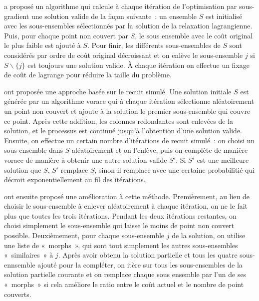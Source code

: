 \documentclass[12pt,letterpaper,twoside]{article}
\begin{document}
				\citeauthor{Beasley1990} a proposé un algorithme qui calcule à chaque itération de l'optimisation par sous-gradient une
				solution valide de la façon suivante : un ensemble \(S\) est initialisé avec les sous-ensembles sélectionnés
				par la solution de la relaxation lagrangienne. Puis, pour chaque point non couvert par \(S\),
				le sous ensemble avec le coût original le plus faible est ajouté à \(S\). Pour finir, les différents sous-ensembles
				de \(S\) sont considérés par ordre de coût original décroissant et on enlève le sous-ensemble \(j\) si \(S \backslash \{j\}\)
				est toujours une solution valide. À chaque itération on effectue un fixage de coût de lagrange pour réduire la taille
				du problème.~\cite{Beasley1990}	

				\citeauthor{jacobs1995lsh} ont proposée une approche basée sur le recuit simulé. Une solution initiale \(S\)
				est générée par un algorithme vorace qui à chaque itération sélectionne aléatoirement un point non couvert
				et ajoute à la solution le premier sous-ensemble qui couvre ce point. Après cette addition, les colonnes
				redondantes sont enlevées de la solution, et le processus est continué jusqu'à l'obtention d'une solution valide.
				Ensuite, on effectue un certain nombre d'itérations de recuit simulé : on choisi un sous-ensemble dans \(S\) aléatoirement
				et on l'enlève, puis on complète de manière vorace de manière à obtenir une autre solution valide \(S'\). Si \(S'\)
				est une meilleure solution que \(S\), \(S'\) remplace \(S\), sinon il remplace avec une certaine probabilitié qui
				décroit exponentiellement au fil des itérations.~\cite{jacobs1995lsh}

				\citeauthor{Brusco1999} ont ensuite proposé une amélioration à cette méthode.
				Premièrement, au lieu de choisir le sous-ensemble à enlever aléatoirement à chaque itération, on ne le fait plus
				que toutes les trois itérations. Pendant les deux itérations restantes, on choisi simplement le sous-ensemble qui
				laisse le moins de point non couvert possible. Deuxièmement, pour chaque sous-ensemble \(j\) de la solution,
				on utilise une liste de « morphs », qui sont tout simplement les autres sous-ensembles « similaires » à \(j\).
				Après avoir obtenu la solution partielle et tous les quatre sous-ennsemble ajouté pour la compléter, on itère
				sur tous les sous-ensembles de la solution partielle courante
				et on remplace chaque sous ensemble par l'un de ses « morphs » si cela améliore le ratio entre le coût actuel
				et le nombre de point couverts.~\cite{Brusco1999}
\end{document}

